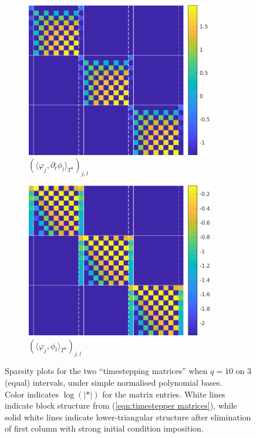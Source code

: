 \begin{example}
        \begin{figure}[!ht]
            \centering
            \begin{subfigure}{0.5\textwidth}
                \centering
                \includegraphics[width = 0.9\textwidth]{paper/9 - finite elements in time/images/matrix 1.png}
                \caption{$(\langle\varphi_{j}, \partial_{t}\phi_{l}\rangle_{T^{h}})_{j, l}$}
            \end{subfigure}%
            \begin{subfigure}{0.5\textwidth}
                \centering
                \includegraphics[width = 0.9\textwidth]{paper/9 - finite elements in time/images/matrix 2.png}
                \caption{$(\langle\varphi_{j}, \phi_{l}\rangle_{T^{h}})_{j, l}$}
            \end{subfigure}
            \caption{Sparsity plots for the two ``timestepping matrices'' when $q = 10$ on 3 (equal) intervals, under simple normalised polynomial bases. \\ Color indicates $\log(|*|)$ for the matrix entries. White lines indicate block structure from (\ref{eqn:timestepper matrices}), while solid white lines indicate lower-triangular structure after elimination of first column with strong initial condition imposition.}
            \label{fig:timestepper matrices}
        \end{figure}
    \end{example}
    \line

    
